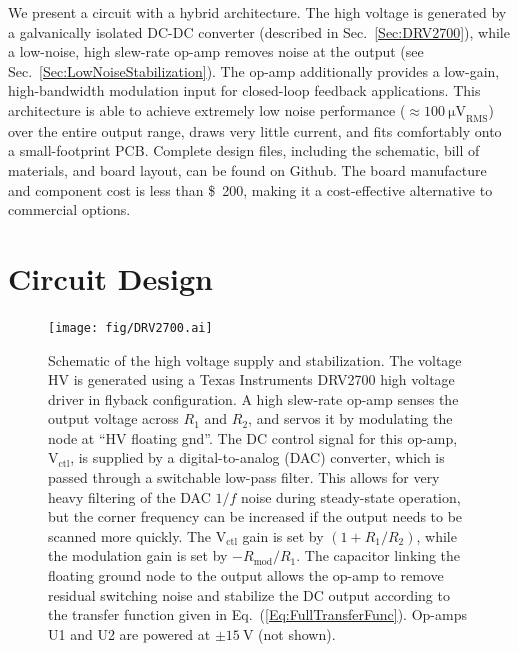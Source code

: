 \documentclass[aip,rsi,reprint]{revtex4-1} %
\begin{document}
We present a circuit with a hybrid architecture. The high voltage is generated by a galvanically isolated DC-DC converter (described in Sec.~\ref{Sec:DRV2700}), while a low-noise, high slew-rate op-amp removes noise at the output  (see Sec.~\ref{Sec:LowNoiseStabilization}).
The op-amp additionally provides a low-gain, high-bandwidth modulation input for closed-loop feedback applications.
This architecture is able to achieve extremely low noise performance ($\approx\SI{100}{\micro\volt}_{\text{RMS}}$) over the entire output range, draws very little current, and fits comfortably onto a small-footprint PCB.
Complete design files, including the schematic, bill of materials, and board layout, can be found on Github\cite{DesignFiles}.
The board manufacture and component cost is less than \SI{200}[\$]{}, making it a cost-effective alternative to commercial options. 



\section{Circuit Design}
\label{Sec:Circuit}

\begin{figure}[t]
\texttt{[image: fig/DRV2700.ai]}
\caption{Schematic of the high voltage supply and stabilization.
The voltage HV is generated using a Texas Instruments DRV2700 high voltage driver in flyback configuration.
A high slew-rate op-amp senses the output voltage across $R_1$ and $R_2$, and servos it by modulating the node at ``HV floating gnd''.
The DC control signal for this op-amp,  $\text{V}_{\text{ctl}}$, is supplied by a digital-to-analog (DAC) converter, which is passed through a switchable low-pass filter. This allows for very heavy filtering of the DAC $1/f$ noise during steady-state operation, but the corner frequency can be increased if the output needs to be scanned more quickly.
The $\text{V}_{\text{ctl}}$ gain is set by $\left(1+R_1/R_2\right)$, while the modulation gain is set by $-R_{\text{mod}}/R_1$.
The capacitor linking the floating ground node to the output allows the op-amp to remove residual switching noise and stabilize the DC output according to the transfer function given in Eq.~(\ref{Eq:FullTransferFunc}).
Op-amps U1 and U2 are powered at $\pm\SI{15}{\volt}$ (not shown).
\label{Fig:PiezoCircuit}}
\end{figure}
\end{document}
